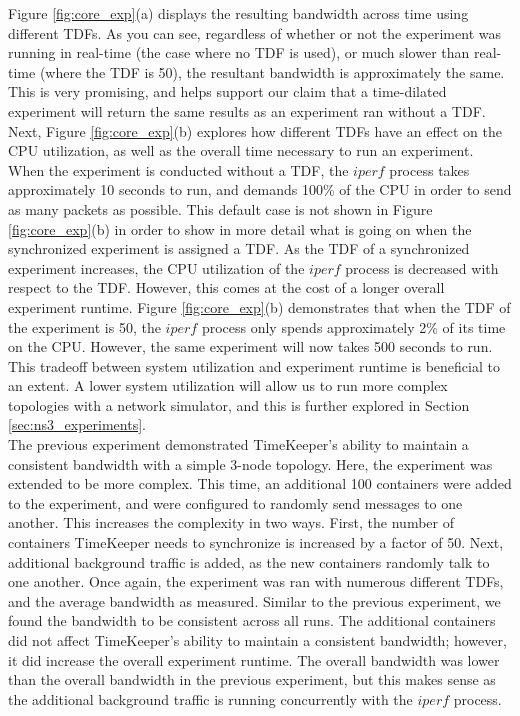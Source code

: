Figure \ref{fig:core_exp}(a) displays the resulting bandwidth across time using different TDFs. As you can see, regardless of whether or not the experiment was running in real-time (the case where no TDF is used), or much slower than real-time (where the TDF is 50), the resultant bandwidth is approximately the same. This is very promising, and helps support our claim that a time-dilated experiment will return the same results as an experiment ran without a TDF. Next, Figure \ref{fig:core_exp}(b) explores how different TDFs have an effect on the CPU utilization, as well as the overall time necessary to run an experiment. When the experiment is conducted without a TDF, the $iperf$ process takes approximately 10 seconds to run, and demands 100\% of the CPU in order to send as many packets as possible. This default case is not shown in Figure \ref{fig:core_exp}(b) in order to show in more detail what is going on when the synchronized experiment is assigned a TDF. As the TDF of a synchronized experiment increases, the CPU utilization of the $iperf$ process is decreased with respect to the TDF. However, this comes at the cost of a longer overall experiment runtime. Figure \ref{fig:core_exp}(b) demonstrates that when the TDF of the experiment is 50, the $iperf$ process only spends approximately 2\% of its time on the CPU. However, the same experiment will now takes 500 seconds to run. This tradeoff between system utilization and experiment runtime is beneficial to an extent. A lower system utilization will allow us to run more complex topologies with a network simulator, and this is further explored in Section \ref{sec:ns3_experiments}. \\ 
The previous experiment demonstrated TimeKeeper's ability to maintain a consistent bandwidth with a simple 3-node topology. Here, the experiment was extended to be more complex. This time, an additional 100 containers were added to the experiment, and were configured to randomly send messages to one another. This increases the complexity in two ways. First, the number of containers TimeKeeper needs to synchronize is increased by a factor of 50. Next, additional background traffic is added, as the new containers randomly talk to one another. Once again, the experiment was ran with numerous different TDFs, and the average bandwidth as measured. Similar to the previous experiment, we found the bandwidth to be consistent across all runs. The additional containers did not affect TimeKeeper's ability to maintain a consistent bandwidth; however, it did increase the overall experiment runtime. The overall bandwidth was lower than the overall bandwidth in the previous experiment, but this makes sense as the additional background traffic is running concurrently with the $iperf$ process.
